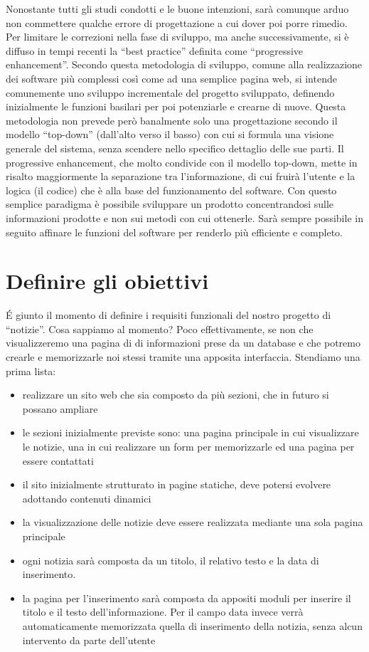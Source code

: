 Nonostante tutti gli studi condotti e le buone intenzioni, sarà comunque arduo non commettere qualche errore di progettazione a cui dover poi porre rimedio. Per limitare le correzioni nella fase di sviluppo, ma anche successivamente, si è diffuso in tempi recenti la ``best practice'' definita come ``progressive enhancement''. Secondo questa metodologia di sviluppo, comune alla realizzazione dei software più complessi così come ad una semplice pagina web, si intende comunemente uno sviluppo incrementale del progetto sviluppato, definendo inizialmente le funzioni basilari per poi potenziarle e crearne di nuove. Questa metodologia non prevede però banalmente solo una progettazione secondo il modello ``top-down'' (dall'alto verso il basso) con cui si formula una visione generale del sistema, senza scendere nello specifico dettaglio delle sue parti. Il progressive enhancement, che molto condivide con il modello top-down, mette in risalto maggiormente la separazione tra l'informazione, di cui fruirà l'utente e la logica (il codice) che è alla base del funzionamento del software. Con questo semplice paradigma è possibile sviluppare un prodotto concentrandosi sulle informazioni prodotte e non sui metodi con cui ottenerle. Sarà sempre possibile in seguito affinare le funzioni del software per renderlo più efficiente e completo.

\section*{Definire gli obiettivi}
\'E giunto il momento di definire i requisiti funzionali del nostro progetto di ``notizie''. Cosa sappiamo al momento? Poco effettivamente, se non che visualizzeremo una pagina di di informazioni prese da un database e che potremo crearle e memorizzarle noi stessi tramite una apposita interfaccia. Stendiamo una prima lista:

\label{sec:notizia}
\begin{itemize}
\item realizzare un sito web che sia composto da più sezioni, che in futuro si possano ampliare
\item le sezioni inizialmente previste sono: una pagina principale in cui visualizzare le notizie, una in cui realizzare un form per memorizzarle ed una pagina per essere contattati
\item il sito inizialmente strutturato in pagine statiche, deve potersi evolvere adottando contenuti dinamici
\item la visualizzazione delle notizie deve essere realizzata mediante una sola pagina principale
\item ogni notizia sarà composta da un titolo, il relativo testo e la data di inserimento.
\item la pagina per l'inserimento sarà composta da appositi moduli per inserire il titolo e il testo dell'informazione. Per il campo data invece verrà automaticamente memorizzata quella di inserimento della notizia, senza alcun intervento da parte dell'utente
\end{itemize}

